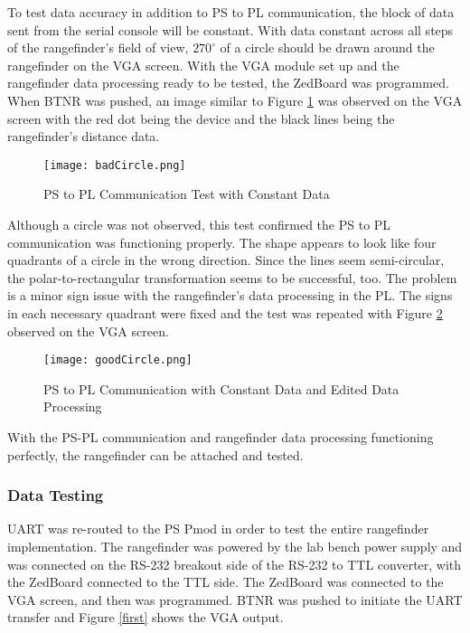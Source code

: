 \par
To test data accuracy in addition to PS to PL communication, the block of data sent from the serial console will be constant. With data constant across all steps of the rangefinder's field of view, $270^\circ$ of a circle should be drawn around the rangefinder on the VGA screen. With the VGA module set up and the rangefinder data processing ready to be tested, the ZedBoard was programmed. When BTNR was pushed, an image similar to Figure \ref{badCircle} was observed on the VGA screen with the red dot being the device and the black lines being the rangefinder's distance data.

\begin{figure}[H]
	\centerline{\texttt{[image: badCircle.png]}}
	\caption{PS to PL Communication Test with Constant Data}
	\label{badCircle}
\end{figure}

Although a circle was not observed, this test confirmed the PS to PL communication was functioning properly. The shape appears to look like four quadrants of a circle in the wrong direction. Since the lines seem semi-circular, the polar-to-rectangular transformation seems to be successful, too. The problem is a minor sign issue with the rangefinder's data processing in the PL. The signs in each necessary quadrant were fixed and the test was repeated with Figure \ref{goodCircle} observed on the VGA screen.

\begin{figure}[H]
	\centerline{\texttt{[image: goodCircle.png]}}
	\caption{PS to PL Communication with Constant Data and Edited Data Processing}
	\label{goodCircle}
\end{figure}

With the PS-PL communication and rangefinder data processing functioning perfectly, the rangefinder can be attached and tested.

\subsubsection{Data Testing}
UART was re-routed to the PS Pmod in order to test the entire rangefinder implementation. The rangefinder was powered by the lab bench power supply and was connected on the RS-232 breakout side of the RS-232 to TTL converter, with the ZedBoard connected to the TTL side. The ZedBoard was connected to the VGA screen, and then was programmed. BTNR was pushed to initiate the UART transfer and Figure \ref{first} shows the VGA output.

